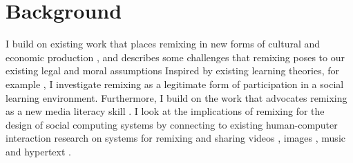 \chapter{Background}

I build on existing work that places remixing in new forms of cultural and economic production \citep{benkler_wealth_2006,jenkins_convergence_2006,manovich_remix_2005,sinnreich_ethics_2009}, and describes some challenges that remixing poses to our existing legal and moral assumptions \citep{lessig_remix:_2008, posner_little_2007}
Inspired by existing learning theories, for example \citet{lave_situated_1991}, I investigate remixing as a legitimate form of participation in a social learning environment.
Furthermore,  I build on the work that advocates remixing as a new media literacy skill \citep{ito_hanging_2010, jenkins_confronting_2009, livingstone_taking_2008, perkel_copy_2008}.
I look at the implications of remixing for the design of social computing systems by connecting to existing human-computer interaction research on systems for remixing and sharing videos \citep{diakopoulos_evolution_2007}, images \citep{seneviratne_policy-aware_2009}, music \citep{cheliotis_analysis_2009} and hypertext \citep{viegas_studying_2004}.
